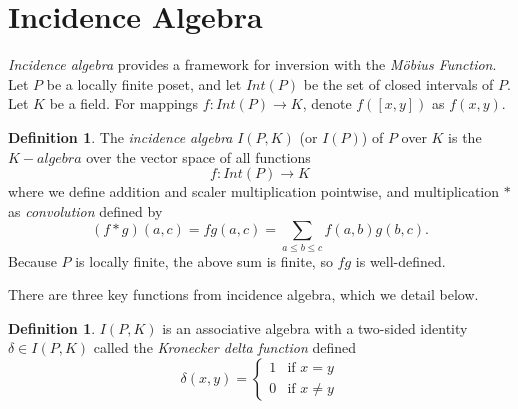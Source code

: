 \documentclass[psamsfonts]{amsart}
\theoremstyle{definition}
\newtheorem{defn}[thm]{Definition}
\theoremstyle{remark}
\numberwithin{equation}{section}
\begin{document}
\section{Incidence Algebra}
 \textit{Incidence algebra} provides a framework for inversion with the \textit{M\"{o}bius Function}. Let $P$ be a locally finite poset, and let $Int(P)$ be the set of closed intervals of $P$. Let $K$ be a field. For mappings $f:Int(P)\rightarrow K$, denote $f([x,y])$ as $f(x,y)$. 
\begin{defn}
The \textit{incidence algebra} $I(P,K)$ (or $I(P)$) of $P$ over $K$ is the $K-algebra$ over the vector space of all functions
\begin{equation*}
    f: Int(P) \rightarrow K
\end{equation*}
where we define addition and scaler multiplication pointwise, and multiplication $*$ as \textit{convolution} defined by
\begin{equation*}
    (f * g)(a,c) = fg(a,c) = \sum_{a\leq b\leq c}f(a,b)g(b,c).
\end{equation*}
Because $P$ is locally finite, the above sum is finite, so $fg$ is well-defined.
\end{defn}

There are three key functions from incidence algebra, which we detail below.

\begin{defn}
$I(P,K)$ is an associative algebra with a two-sided identity \\$\delta\in I(P,K)$ called the \textit{Kronecker delta function} defined
\begin{equation}\label{delta_function}
    \delta(x,y) = 
    \begin{cases}
    1 & \text{if } x = y\\
    0 & \text{if } x\neq y
    \end{cases}
\end{equation}
\end{defn}
\end{document}
